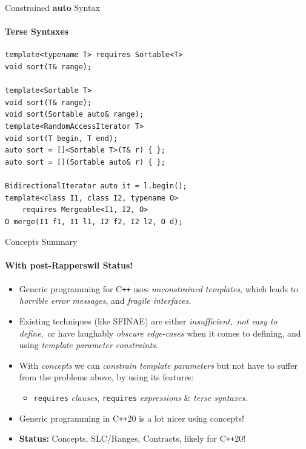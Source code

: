 \documentclass{beamer}
\begin{document}
    \begin{frame}[fragile]{Constrained \textbf{auto} Syntax}
        \framesubtitle{Terse Syntaxes}
        \begin{center}
        \begin{lstlisting}
template<typename T> requires Sortable<T>
void sort(T& range);

template<Sortable T>
void sort(T& range);
void sort(Sortable auto& range);
template<RandomAccessIterator T>
void sort(T begin, T end);
auto sort = []<Sortable T>(T& r) { };
auto sort = [](Sortable auto& r) { };

BidirectionalIterator auto it = l.begin();
template<class I1, class I2, typename O>
    requires Mergeable<I1, I2, O>
O merge(I1 f1, I1 l1, I2 f2, I2 l2, O d); \end{lstlisting}
        \end{center}
    \end{frame}

    \begin{frame}[fragile]{Concepts Summary}
        \framesubtitle{With post-Rapperswil Status!}
        \begin{itemize}
            \item{Generic programming for C\texttt{++} uses \emph{unconstrained templates}, which leads to \emph{horrible error messages}, and \emph{fragile interfaces}.}
            \item{Existing techniques (like SFINAE) are either \emph{insufficient},\ \emph{not easy to define},\ or have laughably \emph{obscure edge-cases} when it comes to defining, and using \emph{template parameter constraints}.}
            \item{With \emph{concepts} we can \emph{constrain template parameters} but not have to suffer from the problems above, by using its features:}
                \begin{itemize}
                    \item{\texttt{requires} \emph{clauses}, \texttt{requires} \emph{expressions} \& \emph{terse syntaxes}.}
                \end{itemize}
            \item{Generic programming in C\texttt{++}20 is a lot nicer using concepts!}
            \item{\textbf{Status:} Concepts, SLC/Ranges, Contracts, likely for C\texttt{++}20!}
        \end{itemize}
    \end{frame}
\end{document}
